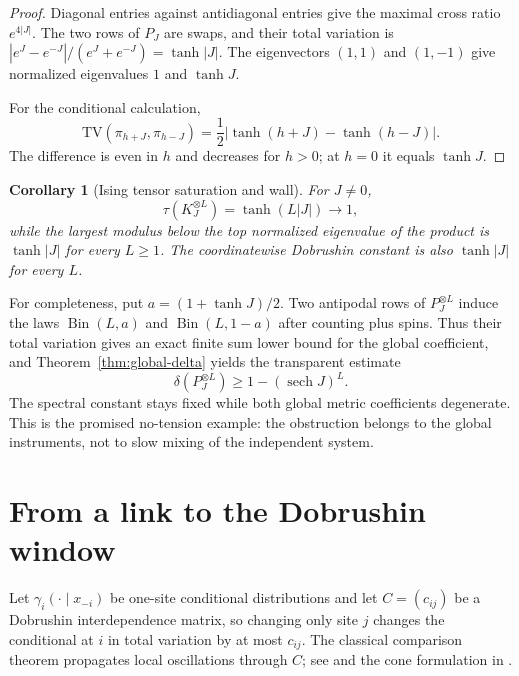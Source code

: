 \documentclass[11pt]{article}
\newtheorem{corollary}[theorem]{Corollary}
\newcommand{\TV}{\mathrm{TV}}
\newcommand{\1}{\mathbf{1}}
\begin{document}
\begin{proof}
Diagonal entries against antidiagonal entries give the maximal cross ratio
$e^{4|J|}$.  The two rows of $P_J$ are swaps, and their total variation is
$|e^J-e^{-J}|/(e^J+e^{-J})=\tanh|J|$.  The eigenvectors $(1,1)$ and $(1,-1)$
give normalized eigenvalues $1$ and $\tanh J$.

For the conditional calculation,
\[
 \TV(\pi_{h+J},\pi_{h-J})
 =\frac12|\tanh(h+J)-\tanh(h-J)|.
\]
The difference is even in $h$ and decreases for $h>0$; at $h=0$ it equals
$\tanh J$.
\end{proof}

\begin{corollary}[Ising tensor saturation and wall]
For $J\ne0$,
\begin{equation}\label{eq:ising-wall}
 \tau(K_J^{\otimes L})=\tanh(L|J|)\longrightarrow1,
\end{equation}
while the largest modulus below the top normalized eigenvalue of the product
is $\tanh|J|$ for every $L\geq1$.  The coordinatewise Dobrushin constant is
also $\tanh|J|$ for every $L$.
\end{corollary}

For completeness, put $a=(1+\tanh J)/2$.  Two antipodal rows of
$P_J^{\otimes L}$ induce the laws $\operatorname{Bin}(L,a)$ and
$\operatorname{Bin}(L,1-a)$ after counting plus spins.  Thus their total
variation gives an exact finite sum lower bound for the global coefficient,
and Theorem~\ref{thm:global-delta} yields the transparent estimate
\begin{equation}\label{eq:ising-hellinger}
 \delta(P_J^{\otimes L})\geq1-(\operatorname{sech}J)^L.
\end{equation}
The spectral constant stays fixed while both global metric coefficients
degenerate.  This is the promised no-tension example: the obstruction belongs
to the global instruments, not to slow mixing of the independent system.

\section{From a link to the Dobrushin window}

Let $\gamma_i(\cdot\mid x_{-i})$ be one-site conditional distributions and
let $C=(c_{ij})$ be a Dobrushin interdependence matrix, so changing only site
$j$ changes the conditional at $i$ in total variation by at most $c_{ij}$.
The classical comparison theorem propagates local oscillations through $C$;
see \cite{Dobrushin1968,Dobrushin1970} and the cone formulation in
\cite{GaubertQu2014}.
\end{document}
